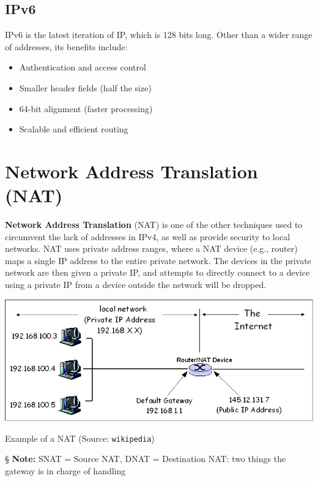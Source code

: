 \documentclass{report}
\newcommand{\npar}{\par\noindent}
\newcommand{\nnote}{\npar \S \textbf{ Note: }}
\begin{document}
\newpage
\subsection{IPv6}
\par IPv6 is the latest iteration of IP, which is 128 bits long. Other than a wider range of addresses, its benefits include:
\begin{itemize}
    \item Authentication and access control
    \item Smaller header fields (half the size)
    \item 64-bit alignment (faster processing)
    \item Scalable and efficient routing
\end{itemize}

\section{Network Address Translation (NAT)}

\par \textbf{Network Address Translation} (NAT) is one of the other techniques used to circumvent the lack of addresses in IPv4, as well as provide security to local networks. NAT uses private address ranges, where a NAT device (e.g., router) maps a single IP address to the entire private network. The devices in the private network are then given a private IP, and attempts to directly connect to a device using a private IP from a device outside the network will be dropped.

\begin{center}
    \includegraphics[scale=0.5]{2-2-2-A.jpg}
    \par Example of a NAT (Source: \verb|wikipedia|)
\end{center}

\nnote SNAT = Source NAT, DNAT = Destination NAT: two things the gateway is in charge of handling
\end{document}
